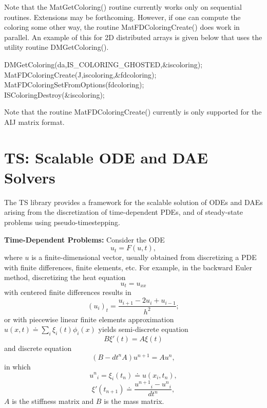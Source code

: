 Note that the MatGetColoring() routine currently 
works only on sequential routines.  Extensions may be forthcoming. However,
if one can compute the coloring  some other way, the routine
MatFDColoringCreate() does work in parallel. An example of this for 
2D distributed arrays is given below that uses the utility routine
DMGetColoring().

\begin{tabbing}
   DMGetColoring(da,IS\_COLORING\_GHOSTED,\&iscoloring);\\
   MatFDColoringCreate(J,iscoloring,\&fdcoloring); \\
   MatFDColoringSetFromOptions(fdcoloring);\\
   ISColoringDestroy(\&iscoloring);
\end{tabbing}

Note that the routine MatFDColoringCreate() currently is only 
supported for the AIJ matrix format.

\cleardoublepage
\chapter{TS: Scalable ODE and DAE Solvers}
\label{chapter_ts}

The TS library provides a framework for the scalable solution of ODEs and DAEs
arising from the discretization of time-dependent PDEs, and of
steady-state problems using pseudo-timestepping.

\vspace{.2cm}

\noindent

{\bf Time-Dependent Problems:} Consider the ODE
\[
              u_t = F(u,t),
\]
where $ u $ is a finite-dimensional vector, usually obtained from
discretizing a PDE with finite differences, finite elements, etc.
For example, in the backward Euler method, discretizing the heat equation 
\[
          u_t = u_{xx} 
\]
with centered finite differences results in 
\[
          (u_i)_t = \frac{u_{i+1} - 2 u_{i} + u_{i-1}}{h^2};
\]
or with piecewise linear finite elements approximation
$ u(x,t) \doteq \sum_i \xi_i(t) \phi_i(x)$ yields semi-discrete equation
\[
          B {\xi}'(t) = A \xi(t)
\]
and discrete equation
\[
        ( B - dt^n A  ) u^{n+1} = A u^n, 
\]
in which 
\[
         {u^n}_i = \xi_i(t_n) \doteq u(x_i,t_n),
\]
\[  
         {\xi}'(t_{n+1}) \doteq \frac{{u^{n+1}}_i - {u^{n}}_i }{dt^{n}},
\]
$A$ is the stiffness matrix and $B$ is the mass matrix.

